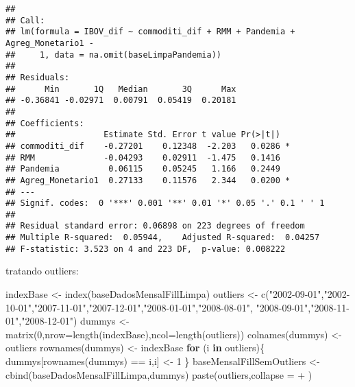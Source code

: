 \documentclass[
]{article}
\newenvironment{Shaded}{\begin{snugshade}}{\end{snugshade}}
\newcommand{\AttributeTok}[1]{\textcolor[rgb]{0.77,0.63,0.00}{#1}}
\newcommand{\ControlFlowTok}[1]{\textcolor[rgb]{0.13,0.29,0.53}{\textbf{#1}}}
\newcommand{\DecValTok}[1]{\textcolor[rgb]{0.00,0.00,0.81}{#1}}
\newcommand{\FunctionTok}[1]{\textcolor[rgb]{0.00,0.00,0.00}{#1}}
\newcommand{\NormalTok}[1]{#1}
\newcommand{\OtherTok}[1]{\textcolor[rgb]{0.56,0.35,0.01}{#1}}
\newcommand{\SpecialCharTok}[1]{\textcolor[rgb]{0.00,0.00,0.00}{#1}}
\newcommand{\StringTok}[1]{\textcolor[rgb]{0.31,0.60,0.02}{#1}}
\begin{document}
\begin{verbatim}
## 
## Call:
## lm(formula = IBOV_dif ~ commoditi_dif + RMM + Pandemia + Agreg_Monetario1 - 
##     1, data = na.omit(baseLimpaPandemia))
## 
## Residuals:
##      Min       1Q   Median       3Q      Max 
## -0.36841 -0.02971  0.00791  0.05419  0.20181 
## 
## Coefficients:
##                  Estimate Std. Error t value Pr(>|t|)  
## commoditi_dif    -0.27201    0.12348  -2.203   0.0286 *
## RMM              -0.04293    0.02911  -1.475   0.1416  
## Pandemia          0.06115    0.05245   1.166   0.2449  
## Agreg_Monetario1  0.27133    0.11576   2.344   0.0200 *
## ---
## Signif. codes:  0 '***' 0.001 '**' 0.01 '*' 0.05 '.' 0.1 ' ' 1
## 
## Residual standard error: 0.06898 on 223 degrees of freedom
## Multiple R-squared:  0.05944,    Adjusted R-squared:  0.04257 
## F-statistic: 3.523 on 4 and 223 DF,  p-value: 0.008222
\end{verbatim}

tratando outliers:

\begin{Shaded}
\begin{Highlighting}[]
\NormalTok{indexBase }\OtherTok{\textless{}{-}} \FunctionTok{index}\NormalTok{(baseDadosMensalFillLimpa)}
\NormalTok{outliers }\OtherTok{\textless{}{-}} \FunctionTok{c}\NormalTok{(}\StringTok{"2002{-}09{-}01"}\NormalTok{,}\StringTok{"2002{-}10{-}01"}\NormalTok{,}\StringTok{"2007{-}11{-}01"}\NormalTok{,}\StringTok{"2007{-}12{-}01"}\NormalTok{,}\StringTok{"2008{-}01{-}01"}\NormalTok{,}\StringTok{"2008{-}08{-}01"}\NormalTok{,}
              \StringTok{"2008{-}09{-}01"}\NormalTok{,}\StringTok{"2008{-}11{-}01"}\NormalTok{,}\StringTok{"2008{-}12{-}01"}\NormalTok{)}
\NormalTok{dummys }\OtherTok{\textless{}{-}} \FunctionTok{matrix}\NormalTok{(}\DecValTok{0}\NormalTok{,}\AttributeTok{nrow=}\FunctionTok{length}\NormalTok{(indexBase),}\AttributeTok{ncol=}\FunctionTok{length}\NormalTok{(outliers))}
\FunctionTok{colnames}\NormalTok{(dummys) }\OtherTok{\textless{}{-}}\NormalTok{ outliers}
\FunctionTok{rownames}\NormalTok{(dummys) }\OtherTok{\textless{}{-}}\NormalTok{ indexBase}
\ControlFlowTok{for}\NormalTok{ (i }\ControlFlowTok{in}\NormalTok{ outliers)\{}
\NormalTok{  dummys[}\FunctionTok{rownames}\NormalTok{(dummys) }\SpecialCharTok{==}\NormalTok{ i,i] }\OtherTok{\textless{}{-}} \DecValTok{1}
\NormalTok{\}}
\NormalTok{baseMensalFillSemOutliers }\OtherTok{\textless{}{-}} \FunctionTok{cbind}\NormalTok{(baseDadosMensalFillLimpa,dummys)}
\FunctionTok{paste}\NormalTok{(outliers,}\AttributeTok{collapse =} \StringTok{\textquotesingle{} + \textquotesingle{}}\NormalTok{)}
\end{Highlighting}
\end{Shaded}
\end{document}
